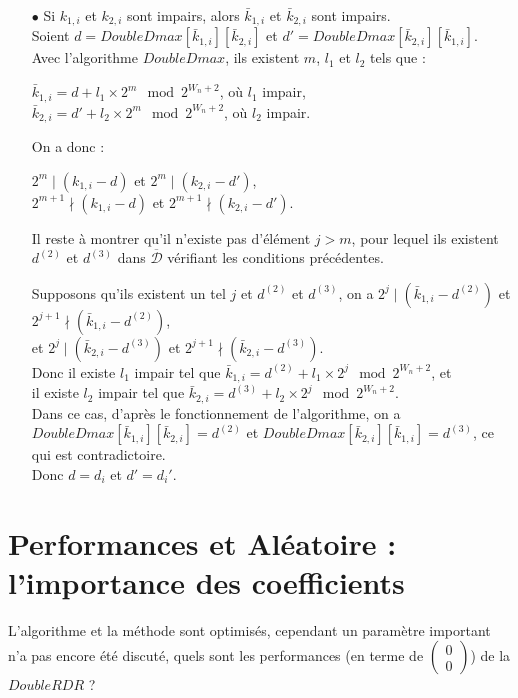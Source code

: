 \documentclass[12pt, a4paper]{memoir}
\newcommand{\doublezero}{\begin{pmatrix} 0 \\ 0 \end{pmatrix}}
\newcommand{\dbarre}{\overline{\mathcal{D}}}
\begin{document}
\begin{Preuve}
\begin{itemize}
   \item [$\bullet$] Si $k_{1,i}$ et $k_{2,i}$ sont impairs, alors $\bar{k}_{1,i}$ et $\bar{k}_{2,i}$ sont impairs. \\
   Soient $d = DoubleDmax[\bar{k}_{1,i}][\bar{k}_{2,i}]$ et $d' = DoubleDmax[\bar{k}_{2,i}][\bar{k}_{1,i}]$. \\
   Avec l'algorithme $DoubleDmax$, ils existent $m$, $l_1$ et $l_2$ tels que :
   \begin{center}
   $\bar{k}_{1,i} = d + l_1 \times 2^m \mod 2^{W_n+2}$, où $l_1$ impair, \\
   $\bar{k}_{2,i} = d' + l_2 \times 2^m \mod 2^{W_n+2}$, où $l_2$ impair.
   \end{center}
   On a donc :
   \begin{center}
   $2^{m} \mid (k_{1,i}-d)$ et $2^{m} \mid (k_{2,i}-d')$, \\
   $2^{m+1} \nmid (k_{1,i}-d)$ et $2^{m+1} \nmid (k_{2,i}-d')$.
   \end{center}
   Il reste à montrer qu'il n'existe pas d'élément $j>m$, pour lequel ils existent $d^{(2)}$ et $d^{(3)}$ 
   dans $\dbarre$ vérifiant les conditions précédentes.   
   
   Supposons qu'ils existent un tel $j$ et $d^{(2)}$ et $d^{(3)}$, on a 
   $2^j \mid (\bar{k}_{1,i} - d^{(2)})$ et $2^{j+1} \nmid (\bar{k}_{1,i} - d^{(2)})$, \\
   et $2^j \mid (\bar{k}_{2,i} - d^{(3)})$ et $2^{j+1} \nmid (\bar{k}_{2,i} - d^{(3)})$. \\
   Donc il existe $l_1$ impair tel que $\bar{k}_{1,i} = d^{(2)} + l_1 \times 2^j \mod 2^{W_n+2}$, et \\
   il existe $l_2$ impair tel que $\bar{k}_{2,i} = d^{(3)} + l_2 \times 2^j \mod 2^{W_n+2}$. \\
   Dans ce cas, d'après le fonctionnement de l'algorithme, on a $DoubleDmax[\bar{k}_{1,i}][\bar{k}_{2,i}] = d^{(2)}$
   et $DoubleDmax[\bar{k}_{2,i}][\bar{k}_{1,i}] = d^{(3)}$, ce qui est contradictoire. \\
   Donc $d = d_i$ et $d' = d_i'$.   \end{itemize}
  \end{Preuve}
  
  \chapter{Performances et Aléatoire : l'importance des coefficients}
  
  L'algorithme et la méthode sont optimisés, cependant un paramètre important n'a pas encore été discuté,
  quels sont les performances (en terme de $\doublezero$) de la $DoubleRDR$ ?
  
\end{document}
